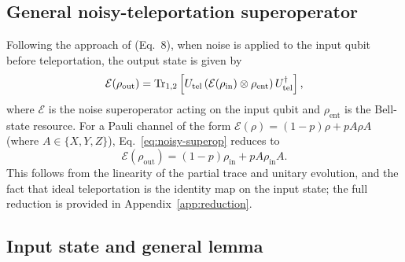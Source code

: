 \documentclass[11pt]{article}
\begin{document}
\subsection{General noisy-teleportation superoperator}

Following the approach of \citet{oh2002} (Eq.~8), when noise is applied to the input qubit before teleportation, the output state is given by
\begin{equation}
\mathcal{E}(\rho_{\text{out}}) = \Tr_{1,2}\left[U_{\text{tel}}\left(\mathcal{E}(\rho_{\text{in}})\otimes\rho_{\text{ent}}\right)U_{\text{tel}}^\dagger\right],
\label{eq:noisy-superop}
\end{equation}
where $\mathcal{E}$ is the noise superoperator acting on the input qubit and $\rho_{\text{ent}}$ is the Bell-state resource. For a Pauli channel of the form $\mathcal{E}(\rho)=(1-p)\rho + pA\rho A$ (where $A\in\{X,Y,Z\}$), Eq.~\eqref{eq:noisy-superop} reduces to
\begin{equation}
\mathcal{E}(\rho_{\text{out}}) = (1-p)\rho_{\text{in}} + pA\rho_{\text{in}}A.
\label{eq:noisy-superop-reduced}
\end{equation}
This follows from the linearity of the partial trace and unitary evolution, and the fact that ideal teleportation is the identity map on the input state; the full reduction is provided in Appendix~\ref{app:reduction}.

\subsection{Input state and general lemma}
\end{document}
